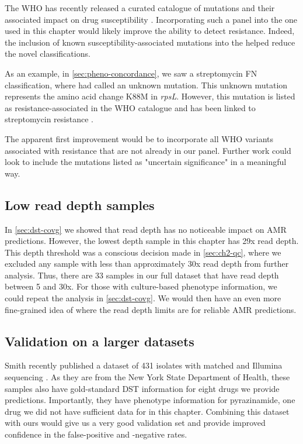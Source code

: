 The WHO has recently released a curated catalogue of \mtb{} mutations and their associated impact on drug susceptibility \cite{whopanel2021}. Incorporating such a panel into the one used in this chapter would likely improve the ability to detect resistance. Indeed, the inclusion of known susceptibility-associated mutations into the \drprg{} helped reduce the novel classifications.

As an example, in \autoref{sec:pheno-concordance}, we saw a streptomycin FN classification, where \drprg{} had called an unknown mutation. This unknown mutation represents the amino acid change K88M in \textit{rpsL}. However, this mutation is listed as resistance-associated in the WHO catalogue and has been linked to streptomycin resistance \cite{Smittipat2016}.

The apparent first improvement would be to incorporate all WHO variants associated with resistance that are not already in our panel. Further work could look to include the mutations listed as "uncertain significance" in a meaningful way.

\subsection{Low read depth samples}

In \autoref{sec:dst-covg} we showed that read depth has no noticeable impact on AMR predictions. However, the lowest depth sample in this chapter has 29x read depth. This depth threshold was a conscious decision made in \autoref{sec:ch2-qc}, where we excluded any sample with less than approximately 30x read depth from further analysis. Thus, there are 33 samples in our full dataset that have \ont{} read depth between 5 and 30x. For those with culture-based phenotype information, we could repeat the analysis in \autoref{sec:dst-covg}. We would then have an even more fine-grained idea of where the \ont{} read depth limits are for reliable AMR predictions.

\subsection{Validation on a larger datasets}

Smith \etal{} recently published a dataset of 431 \mtb{} isolates with matched \ont{} and Illumina sequencing \cite{smith2020}. As they are from the New York State Department of Health, these samples also have gold-standard DST information for eight drugs we provide predictions. Importantly, they have phenotype information for pyrazinamide, one drug we did not have sufficient data for in this chapter. Combining this dataset with ours would give us a very good \ont{} validation set and provide improved confidence in the false-positive and -negative rates. 

